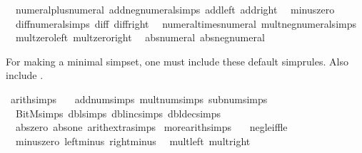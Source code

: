 \begin{isabellebody}
\ \ numeral{\isacharunderscore}{\kern0pt}plus{\isacharunderscore}{\kern0pt}numeral\ add{\isacharunderscore}{\kern0pt}neg{\isacharunderscore}{\kern0pt}numeral{\isacharunderscore}{\kern0pt}simps\ add{\isacharunderscore}{\kern0pt}{}{\isacharunderscore}{\kern0pt}left\ add{\isacharunderscore}{\kern0pt}{}{\isacharunderscore}{\kern0pt}right\isanewline
\ \ minus{\isacharunderscore}{\kern0pt}zero\isanewline
\ \ diff{\isacharunderscore}{\kern0pt}numeral{\isacharunderscore}{\kern0pt}simps\ diff{\isacharunderscore}{\kern0pt}{}\ diff{\isacharunderscore}{\kern0pt}{}{\isacharunderscore}{\kern0pt}right\isanewline
\ \ numeral{\isacharunderscore}{\kern0pt}times{\isacharunderscore}{\kern0pt}numeral\ mult{\isacharunderscore}{\kern0pt}neg{\isacharunderscore}{\kern0pt}numeral{\isacharunderscore}{\kern0pt}simps\isanewline
\ \ mult{\isacharunderscore}{\kern0pt}zero{\isacharunderscore}{\kern0pt}left\ mult{\isacharunderscore}{\kern0pt}zero{\isacharunderscore}{\kern0pt}right\isanewline
\ \ abs{\isacharunderscore}{\kern0pt}numeral\ abs{\isacharunderscore}{\kern0pt}neg{\isacharunderscore}{\kern0pt}numeral%
\begin{isamarkuptext}%
For making a minimal simpset, one must include these default simprules.
  Also include .%
\end{isamarkuptext}\isamarkuptrue%
\isamarkupfalse%
\ arith{\isacharunderscore}{\kern0pt}simps\ {\isacharequal}{\kern0pt}\isanewline
\ \ add{\isacharunderscore}{\kern0pt}num{\isacharunderscore}{\kern0pt}simps\ mult{\isacharunderscore}{\kern0pt}num{\isacharunderscore}{\kern0pt}simps\ sub{\isacharunderscore}{\kern0pt}num{\isacharunderscore}{\kern0pt}simps\isanewline
\ \ BitM{\isachardot}{\kern0pt}simps\ dbl{\isacharunderscore}{\kern0pt}simps\ dbl{\isacharunderscore}{\kern0pt}inc{\isacharunderscore}{\kern0pt}simps\ dbl{\isacharunderscore}{\kern0pt}dec{\isacharunderscore}{\kern0pt}simps\isanewline
\ \ abs{\isacharunderscore}{\kern0pt}zero\ abs{\isacharunderscore}{\kern0pt}one\ arith{\isacharunderscore}{\kern0pt}extra{\isacharunderscore}{\kern0pt}simps\isanewline
\isanewline
{}\isamarkupfalse%
\ more{\isacharunderscore}{\kern0pt}arith{\isacharunderscore}{\kern0pt}simps\ {\isacharequal}{\kern0pt}\isanewline
\ \ neg{\isacharunderscore}{\kern0pt}le{\isacharunderscore}{\kern0pt}iff{\isacharunderscore}{\kern0pt}le\isanewline
\ \ minus{\isacharunderscore}{\kern0pt}zero\ left{\isacharunderscore}{\kern0pt}minus\ right{\isacharunderscore}{\kern0pt}minus\isanewline
\ \ mult{\isacharunderscore}{\kern0pt}{}{\isacharunderscore}{\kern0pt}left\ mult{\isacharunderscore}{\kern0pt}{}{\isacharunderscore}{\kern0pt}right\isanewline

\end{isabellebody}
